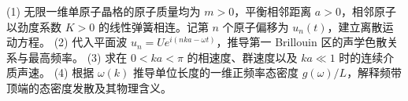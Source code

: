 (1) 无限一维单原子晶格的原子质量均为 \(m>0\)，平衡相邻距离 \(a>0\)，相邻原子以劲度系数 \(K>0\) 的线性弹簧相连。记第 \(n\) 个原子偏移为 \(u_n(t)\)，建立离散运动方程。
(2) 代入平面波 \(u_n=U e^{i(nka-\omega t)}\)，推导第一 Brillouin 区的声学色散关系与最高频率。
(3) 求在 \(0<ka<\pi\) 的相速度、群速度以及 \(ka\ll1\) 时的连续介质声速。
(4) 根据 \(\omega(k)\) 推导单位长度的一维正频率态密度 \(g(\omega)/L\)，解释频带顶端的态密度发散及其物理含义。
